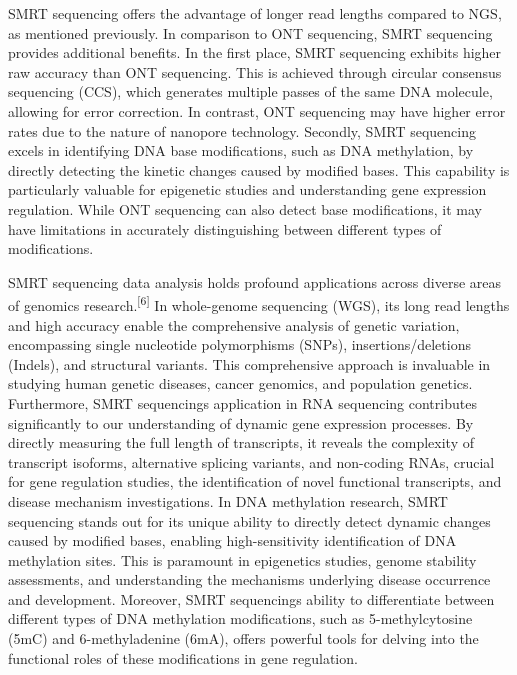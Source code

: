 \documentclass[
]{article}
\begin{document}
SMRT sequencing offers the advantage of longer read lengths compared to
NGS, as mentioned previously. In comparison to ONT sequencing, SMRT
sequencing provides additional benefits. In the first place, SMRT
sequencing exhibits higher raw accuracy than ONT sequencing. This is
achieved through circular consensus sequencing (CCS), which generates
multiple passes of the same DNA molecule, allowing for error correction.
In contrast, ONT sequencing may have higher error rates due to the
nature of nanopore technology. Secondly, SMRT sequencing excels in
identifying DNA base modifications, such as DNA methylation, by directly
detecting the kinetic changes caused by modified bases. This capability
is particularly valuable for epigenetic studies and understanding gene
expression regulation. While ONT sequencing can also detect base
modifications, it may have limitations in accurately distinguishing
between different types of modifications.

SMRT sequencing data analysis holds profound applications across diverse
areas of genomics research.\textsuperscript{{[}6{]}} In whole-genome
sequencing (WGS), its long read lengths and high accuracy enable the
comprehensive analysis of genetic variation, encompassing single
nucleotide polymorphisms (SNPs), insertions/deletions (Indels), and
structural variants. This comprehensive approach is invaluable in
studying human genetic diseases, cancer genomics, and population
genetics. Furthermore, SMRT sequencing\textquotesingle s application in
RNA sequencing contributes significantly to our understanding of dynamic
gene expression processes. By directly measuring the full length of
transcripts, it reveals the complexity of transcript isoforms,
alternative splicing variants, and non-coding RNAs, crucial for gene
regulation studies, the identification of novel functional transcripts,
and disease mechanism investigations. In DNA methylation research, SMRT
sequencing stands out for its unique ability to directly detect dynamic
changes caused by modified bases, enabling high-sensitivity
identification of DNA methylation sites. This is paramount in
epigenetics studies, genome stability assessments, and understanding the
mechanisms underlying disease occurrence and development. Moreover, SMRT
sequencing\textquotesingle s ability to differentiate between different
types of DNA methylation modifications, such as 5-methylcytosine (5mC)
and 6-methyladenine (6mA), offers powerful tools for delving into the
functional roles of these modifications in gene regulation.
\end{document}
